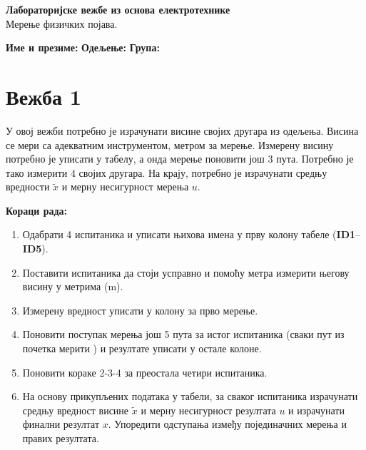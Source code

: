 \documentclass[10pt]{article}
\begin{document}
\begin{center}
    {\LARGE\bfseries Лабораторијске вежбе из основа електротехнике} \\
    {\Large Мерење физичких појава.} \\
\end{center}
\vspace{10pt}

\noindent
\textbf{Име и презиме:} \hrulefill \quad
\textbf{Одељење:} \underline{\hspace{2cm}} \quad
\textbf{Група:} \underline{\hspace{1.5cm}}

\vspace{15pt}

\section{Вежба 1}

У овој вежби потребно је израчунати висине својих другара из одељења.
Висина се мери са адекватним инструментом, метром за мерење. Измерену висину
потребно је уписати у табелу, а онда мерење поновити још 3 пута. Потребно је тако
измерити 4 својих другара. На крају, потребно је израчунати средњу вредности $\tilde{x}$ и 
мерну несигурност мерења $u$.

\textbf{Кораци рада:}
\begin{enumerate}
  \item Одабрати 4 испитаника и уписати њихова имена 
  у прву колону табеле (\textbf{ID1}--\textbf{ID5}).
  \item Поставити испитаника да стоји усправно и помоћу метра измерити 
  његову висину у метрима ($\text{m}$).
  \item Измерену вредност уписати у колону за прво мерење.
  \item Поновити поступак мерења још 5 пута за истог испитаника (сваки пут из почетка мерити
  ) и резултате уписати у остале колоне.
  \item Поновити кораке 2-3-4 за преостала четири испитаника.
  \item На основу прикупљених података у табели, за сваког испитаника израчунати средњу 
  вредност висине $\tilde{x}$ и мерну несигурност резултата $u$ и израчунати финални резултат $x$.
  Упоредити одступања између појединачних мерења и правих резултата.
\end{enumerate}
\end{document}
